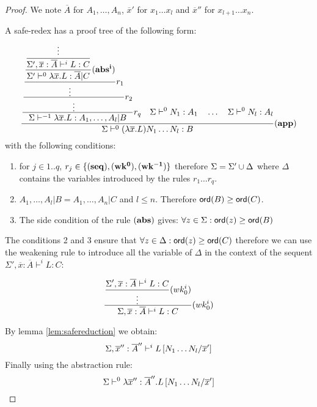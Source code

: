 \begin{proof}
We note $\overline{A}$ for $A_1, \ldots , A_n$, $\overline{x}'$ for
$x_1 \ldots x_l$ and $\overline{x}''$ for $x_{l+1} \ldots x_n$.

A safe-redex has a proof tree of the following form:
$$
   \frac{\displaystyle 
        \frac{\displaystyle 
            \frac{\displaystyle 
                \frac{\displaystyle 
                    \frac{\displaystyle  \frac{\displaystyle \vdots}{\Sigma',\overline{x}:\overline{A}\vdash^i L:C  }
                        }{\Sigma' \vdash^0 \lambda \overline{x} . L : \overline{A}|C} \mathbf{(abs^i)}
                }{\vdots} r_1
            }{\vdots} r_2
            }{ \Sigma \vdash^{-1} \lambda \overline{x} . L : A_1, \ldots , A_l|B} r_q
            \quad
            \Sigma \vdash^0 N_1 : A_1
            \quad \ldots \quad \Sigma \vdash^0 N_l : A_l
    }{
       \Sigma \vdash^0 (\lambda \overline{x} . L) N_1 \ldots N_l : B
    } (\mathbf{app})
$$
with the following conditions:
\begin{enumerate}
\item for $j\in 1..q$, $r_j \in \{ \mathbf{(seq)}, \mathbf{(wk^0)}, \mathbf{(wk^{-1})} \}$ therefore
$\Sigma = \Sigma' \cup \Delta$ where $\Delta$ contains the
variables introduced by the rules $r_1 \ldots r_q$.

\item $A_1, \ldots , A_l|B = A_1, \ldots , A_n|C$ and $l\leq n$. Therefore
${\sf ord}(B) \geq {\sf ord}(C)$.
\item The side condition of the rule $\mathbf{(abs)}$ gives: $\forall z \in \Sigma : {\sf ord}(z) \geq {\sf ord}(B)$
\end{enumerate}


The conditions 2 and 3 ensure that $\forall z \in \Delta : {\sf ord}(z)
\geq {\sf ord}(C)$ therefore we can use the weakening rule to introduce
all the variable of $\Delta$ in the context of the sequent
$\Sigma',\overline{x}:\overline{A}\vdash^i L:C$:

$$\frac{\displaystyle \frac{\displaystyle  \Sigma',\overline{x}:\overline{A}\vdash^i L:C  }{\vdots} (wk^i_0)}{\Sigma,\overline{x}:\overline{A}\vdash^i L:C} (wk^i_0)
$$

By lemma \ref{lem:safereduction} we obtain:
$$ \Sigma, \overline{x}'':\overline{A}'' \vdash^i L\left[ N_1 \ldots N_l/\overline{x}' \right]$$
Finally using the abstraction rule:
$$ \Sigma \vdash^0 \lambda \overline{x}'':\overline{A}'' . L\left[ N_1 \ldots N_l/\overline{x}' \right]$$
\end{proof}







